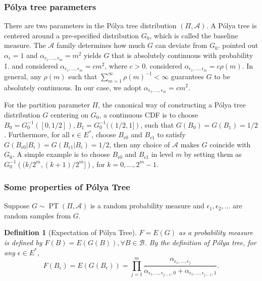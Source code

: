\documentclass[12pt]{article}
\newtheorem{deff}[thm]{Definition}
\newcommand{\polya}{P\'{o}lya}
\DeclareMathOperator{\pt}{PT}
\begin{document}
\subsubsection{\polya{} tree parameters}
There are two parameters in the \polya{} tree distribution $(\Pi, \mathcal{A})$.
A \polya{} tree is centered around a pre-specified distribution $G_0$, which is called the baseline measure.
The $\mathcal{A}$ family determines how much $G$ can deviate from $G_0$.
\citet{ferguson1974} pointed out $\alpha_{\epsilon} = 1$ and $\alpha_{\epsilon_1, \ldots, \epsilon_m} = m^2$ yields $G$ that is absolutely continuous with probability 1.
\citet{walker1999} and \citet{paddock1999} considered $\alpha_{\epsilon_1, \ldots, \epsilon_m} = cm^2$, where $c > 0$. \citet{berger2001} considered $\alpha_{\epsilon_1, \ldots, \epsilon_m} = c \rho(m)$. In general, any $\rho(m) $ such that $\sum_{m=1}^{\infty} \rho(m)^{-1} < \infty$ guarantees $G$ to be absolutely continuous. In our case, we adopt $\alpha_{\epsilon_1, \ldots, \epsilon_m} = cm^2$.

For the partition parameter $\Pi$, the canonical way of constructing
a \polya{} tree distribution $G$ centering on $G_0$, a continuous CDF
is to choose $B_0 = G^{-1}_0 ([0, 1/2]), B_1 = G^{-1}_0 ((1/2,1])$,
such that $G(B_0) = G(B_1)= 1/2$. Furthermore, for all $\epsilon \in
E^{*}$, choose $B_{\epsilon 0 }$ and $B_{\epsilon 1}$ to satisfy
$G(B_{\epsilon 0 } |B_{\epsilon} ) = G(B_{\epsilon 1} | B_{\epsilon})
= 1/2 $, then any choice of $\mathcal{A} $ makes $G$ coincide with
$G_0$. A simple example is to choose $B_{\epsilon 0} $ and
$B_{\epsilon 1}$ in level $m$ by setting them as $G^{-1}_0 \left(
  (k/2^m, (k+1)/2^m] \right)$, for $k=0, \ldots, 2^m-1$.

\subsubsection{Some properties of \polya{} Tree}
Suppose $G \sim \pt (\Pi, \mathcal{A})$ is a random probability
measure and $\epsilon_1, \epsilon_2, \ldots$ are random samples from
$G$.

\begin{deff}[Expectation of \polya{} Tree]
  $F= E(G)$ as a probability measure is defined by $F(B) = E(G(B)),
  \forall B \in \mathcal{B}$. By the definition of \polya{} tree, for
  any $\epsilon \in E^{*}$,
  \begin{displaymath}
    F(B_{\epsilon})  = E(G(B_{\epsilon})) = \prod_{j=1}^m
    \frac{\alpha_{\epsilon_1, \ldots, \epsilon_j}}{\alpha_{\epsilon_1,
        \ldots, \epsilon_{j-1},0} + \alpha_{\epsilon_1, \ldots, \epsilon_{j-1},1}}.
  \end{displaymath}
\end{deff}
\end{document}
